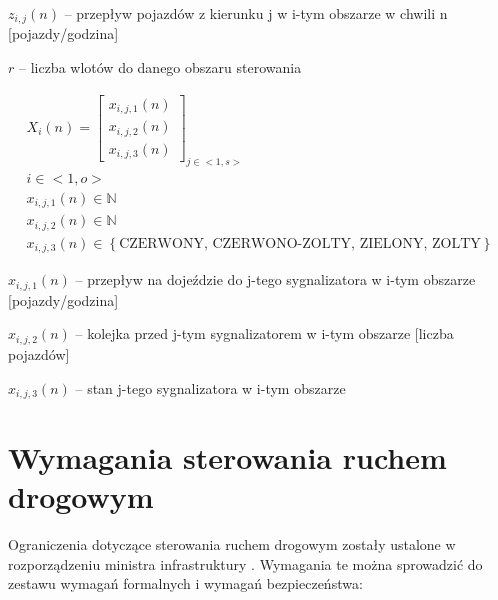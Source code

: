 \begin{math} z_{i,j} (n) \end{math} \textrm{ -- przepływ pojazdów z kierunku j w i-tym obszarze w chwili n [pojazdy/godzina]}

\begin{math} r \end{math} -- liczba wlotów do danego obszaru sterowania

\begin{equation}
	\begin{array}{c}
		X_i (n) = \left[
			\begin{array}{c}
				x_{i, j, 1} (n) \\ x_{i, j, 2} (n) \\ x_{i, j, 3} (n)
			\end{array}
		\right]_{j \in <1,s>}\\
		i \in <1,o>\\
		x_{i, j, 1} (n) \in \mathbb{N}\\
		x_{i, j, 2} (n) \in \mathbb{N}\\
		x_{i, j, 3} (n) \in \left\{ \textrm{CZERWONY, CZERWONO-ZOLTY, ZIELONY, ZOLTY} \right\}
	\end{array}
\end{equation}

\begin{math} x_{i, j, 1} (n) \end{math} \textrm{ -- przepływ na dojeździe do j-tego sygnalizatora w i-tym obszarze [pojazdy/godzina]}

\begin{math} x_{i, j, 2} (n) \end{math} \textrm{ -- kolejka przed j-tym sygnalizatorem w i-tym obszarze [liczba pojazdów]}

\begin{math} x_{i, j, 3} (n) \end{math} \textrm{ -- stan j-tego sygnalizatora w i-tym obszarze}

\section{Wymagania sterowania ruchem drogowym}
\label{sec:model_ograniczenia}
Ograniczenia dotyczące sterowania ruchem drogowym zostały ustalone w rozporządzeniu ministra infrastruktury \cite{rozporzadzenie}. Wymagania te można sprowadzić do zestawu wymagań formalnych i wymagań bezpieczeństwa:
